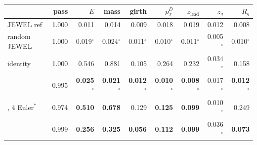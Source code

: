 \scriptsize
\setlength{\tabcolsep}{2pt}
\begin{tabular}{lrrrrrrrr}
\toprule
 & pass & $E$ & mass & girth & $p_T^D$ & $z_\mathrm{lead}$ & $z_g$ & $R_g$ \\
\midrule
JEWEL ref & 1.000 & 0.011 & 0.014 & 0.009 & 0.018 & 0.019 & 0.012 & 0.008 \\
random JEWEL & 1.000 & 0.019$^\circ$ & 0.024$^\circ$ & 0.011$^\circ$ & 0.010$^\circ$ & 0.011$^\circ$ & 0.005$^\circ$ & 0.010$^\circ$ \\
identity & 1.000 & 0.546 & 0.881 & 0.105 & 0.264 & 0.232 & 0.034$^\circ$ & 0.158 \\
\midrule
\ot{} & 0.995 & \textbf{0.025}$^\circ$ & \textbf{0.021}$^\circ$ & \textbf{0.012}$^\circ$ & \textbf{0.010}$^\circ$ & \textbf{0.008}$^\circ$ & 0.017$^\circ$ & \textbf{0.012}$^\circ$ \\
\ot{}, 4 Euler$^\ast$ & 0.974 & \textbf{0.510} & \textbf{0.678} & 0.129 & \textbf{0.125} & \textbf{0.099} & 0.010$^\circ$ & 0.249 \\
\dsbm{} & 0.999 & \textbf{0.256} & \textbf{0.325} & \textbf{0.056} & \textbf{0.112} & \textbf{0.099} & 0.036$^\circ$ & \textbf{0.073} \\
\bottomrule
\end{tabular}
